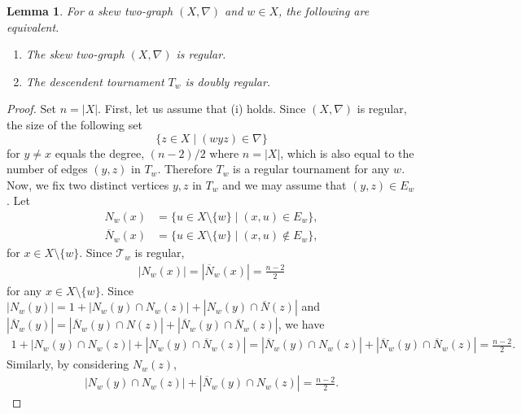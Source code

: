 \documentclass[11pt,oneside]{amsart}
\newtheorem{lemma}[theorem]{Lemma}
\begin{document}
{\begin{lemma}\label{lem:regularskewtwograph} 
For a skew two-graph $(X,\nabla)$  and  $w\in X$,  the following are equivalent. 
    \begin{enumerate}
        \item [\textup{(i)}] The skew two-graph $(X,\nabla)$ is  regular. 
        \item [\textup{(ii)}] The descendent tournament $T_w$ is doubly regular. 
    \end{enumerate}
\end{lemma}
\begin{proof}
    Set $n=|X|$. 
   First, let us assume that (i)  holds.     Since $(X,\nabla)$ is regular, 
    the size of the following set 
    \[
    \{z\in X \mid (wyz)\in\nabla\}
    \]
    for $y\neq x$ equals the degree, $(n-2)/2$ where $n=|X|$, which is also equal to the number of edges $(y,z)$ in $T_w$. 
    Therefore $T_w$ is a regular tournament for any $w$. 
    Now, we fix two distinct vertices $y,z$ in $T_w$ and we may assume that $(y,z)\in E_w$. Let
    \begin{align*}
        N_w(x)&=\{u\in X\setminus\{w\} \mid (x,u)\in E_w\},\\
        \overline{N}_w(x)&=\{u\in X\setminus\{w\} \mid (x,u)\not\in E_w\}, 
    \end{align*}
    for $x\in X\setminus\{w\}$. 
    Since $\mathcal{T}_w$ is regular, 
    \begin{align*}
        |N_w(x)|=|\overline{N}_w(x)|=\frac{n-2}{2}    
    \end{align*}
    for any $x\in X\setminus\{w\}$. 
    Since $|N_w(y)|=1+|N_w(y)\cap N_w(z)|+|N_w(y)\cap \overline{N}(z)|$ and $|\overline{N}_w(y)|=|\overline{N}_w(y)\cap N(z)|+|\overline{N}_w(y)\cap \overline{N}_w(z)|$,  we have 
    \begin{align}\label{eq:drt1}
        1+|N_w(y)\cap N_w(z)|+|N_w(y)\cap \overline{N}_w(z)|=|\overline{N}_w(y)\cap N_w(z)|+|\overline{N}_w(y)\cap \overline{N}_w(z)|=\frac{n-2}{2}.  
    \end{align}
    Similarly, by considering $N_w(z)$, 
    \begin{align}\label{eq:drt11}
        |N_w(y)\cap N_w(z)|+|\overline{N}_w(y)\cap N_w(z)|=\frac{n-2}{2}.  
    \end{align}
    


\end{proof}}
\end{document}
